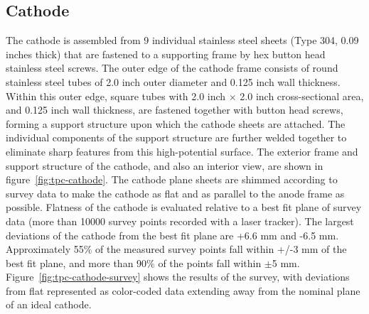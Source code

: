 \subsection{Cathode}
The cathode is assembled from 9 individual stainless steel sheets (Type 304, 0.09 inches thick) that are fastened to a supporting frame by hex button head stainless steel screws. The outer edge of the cathode frame consists of round stainless steel tubes of 2.0 inch outer diameter and 0.125 inch wall thickness.  Within this outer edge, square tubes with 2.0 inch $\times$ 2.0 inch cross-sectional area, and 0.125 inch wall thickness, are fastened together with button head screws, forming a support structure upon which the cathode sheets are attached.  The individual components of the support structure are further welded together to eliminate sharp features from this high-potential surface.  The exterior frame and support structure of the cathode, and also an interior view, are shown in figure~\ref{fig:tpc-cathode}. The cathode plane sheets are shimmed according to survey data to make the cathode as flat and as parallel to the anode frame as possible. Flatness of the cathode is evaluated relative to a best fit plane of survey data (more than 10000 survey points recorded with a laser tracker). The largest deviations of the cathode from the best fit plane are +6.6 mm and -6.5 mm. Approximately 55$\%$ of the measured survey points fall within +/-3 mm of the best fit plane, and more than 90$\%$ of the points fall within $\pm$5 mm.  Figure~\ref{fig:tpc-cathode-survey} shows the results of the survey, with deviations from flat represented as color-coded data extending away from the nominal plane of an ideal cathode. %

